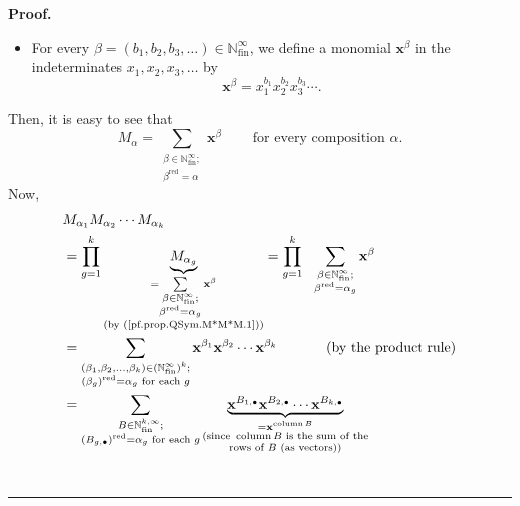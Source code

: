 \documentclass[numbers=enddot,12pt,final,onecolumn,notitlepage,abstracton]{scrartcl}%
\theoremstyle{definition}
\newenvironment{proof}[1][Proof]{\noindent\textbf{#1.} }{\ \rule{0.5em}{0.5em}}
\let\sumnonlimits\sum
\let\prodnonlimits\prod
\renewcommand{\sum}{\sumnonlimits\limits}
\renewcommand{\prod}{\prodnonlimits\limits}
\begin{document}
\begin{proof}
\begin{itemize}
\item For every $\beta=\left(  b_{1},b_{2},b_{3},\ldots\right)  \in
\mathbb{N}_{\operatorname*{fin}}^{\infty}$, we define a monomial
$\mathbf{x}^{\beta}$ in the indeterminates $x_{1},x_{2},x_{3},\ldots$ by%
\[
\mathbf{x}^{\beta}=x_{1}^{b_{1}}x_{2}^{b_{2}}x_{3}^{b_{3}}\cdots.
\]

\end{itemize}

Then, it is easy to see that%
\begin{equation}
M_{\alpha}=\sum_{\substack{\beta\in\mathbb{N}_{\operatorname*{fin}}^{\infty
};\\\beta^{\operatorname*{red}}=\alpha}}\mathbf{x}^{\beta}%
\ \ \ \ \ \ \ \ \ \ \text{for every composition }\alpha.
\label{pf.prop.QSym.M*M*M.1}%
\end{equation}
Now,%
\begin{align}
&  M_{\alpha_{1}}M_{\alpha_{2}}\cdots M_{\alpha_{k}}\nonumber\\
&  =\prod_{g=1}^{k}\underbrace{M_{\alpha_{g}}}_{\substack{=\sum
_{\substack{\beta\in\mathbb{N}_{\operatorname*{fin}}^{\infty};\\\beta
^{\operatorname*{red}}=\alpha_{g}}}\mathbf{x}^{\beta}\\\text{(by
(\ref{pf.prop.QSym.M*M*M.1}))}}}=\prod_{g=1}^{k}\ \ \sum_{\substack{\beta
\in\mathbb{N}_{\operatorname*{fin}}^{\infty};\\\beta^{\operatorname*{red}%
}=\alpha_{g}}}\mathbf{x}^{\beta}\nonumber\\
&  =\sum_{\substack{\left(  \beta_{1},\beta_{2},\ldots,\beta_{k}\right)
\in\left(  \mathbb{N}_{\operatorname*{fin}}^{\infty}\right)  ^{k};\\\left(
\beta_{g}\right)  ^{\operatorname*{red}}=\alpha_{g}\text{ for each }%
g}}\mathbf{x}^{\beta_{1}}\mathbf{x}^{\beta_{2}}\cdots\mathbf{x}^{\beta_{k}%
}\ \ \ \ \ \ \ \ \ \ \left(  \text{by the product rule}\right) \nonumber\\
&  =\sum_{\substack{B\in\mathbb{N}_{\operatorname*{fin}}^{k,\infty};\\\left(
B_{g,\bullet}\right)  ^{\operatorname*{red}}=\alpha_{g}\text{ for each }%
g}}\underbrace{\mathbf{x}^{B_{1,\bullet}}\mathbf{x}^{B_{2,\bullet}}%
\cdots\mathbf{x}^{B_{k,\bullet}}}_{\substack{=\mathbf{x}%
^{\operatorname*{column}B}\\\text{(since }\operatorname*{column}B\text{ is the
sum of the}\\\text{rows of }B\text{ (as vectors))}}}\nonumber\\

\end{align}
\end{proof}
\end{document}
